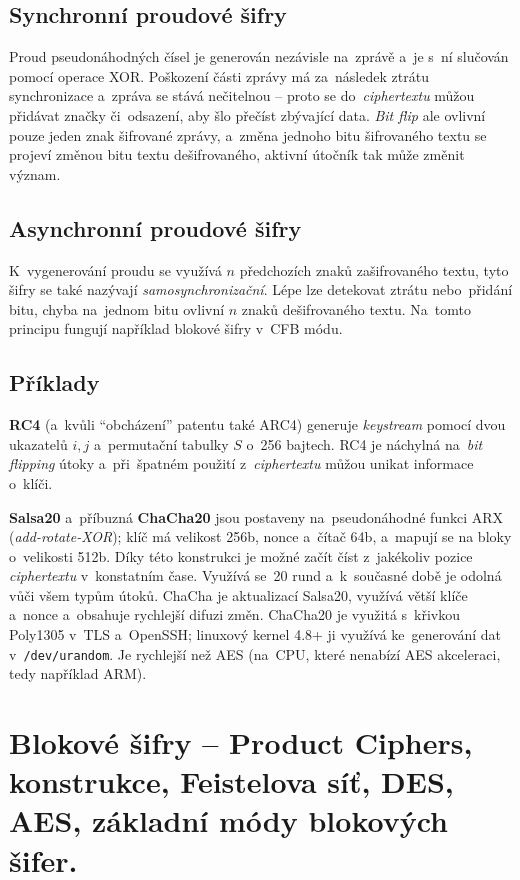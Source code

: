 \subsection{Synchronní proudové šifry}

Proud pseudonáhodných čísel je generován nezávisle na~zprávě a~je s~ní slučován pomocí operace XOR. Poškození části zprávy má za~následek ztrátu synchronizace a~zpráva se stává nečitelnou -- proto se do~\emph{ciphertextu} můžou přidávat značky či~odsazení, aby šlo přečíst zbývající data. \emph{Bit flip} ale ovlivní pouze jeden znak šifrované zprávy, a~změna jednoho bitu šifrovaného textu se projeví změnou bitu textu dešifrovaného, aktivní útočník tak může změnit význam.

\subsection{Asynchronní proudové šifry}

K~vygenerování proudu se využívá $n$ předchozích znaků zašifrovaného textu, tyto šifry se také nazývají \emph{samosynchronizační}. Lépe lze detekovat ztrátu nebo~přidání bitu, chyba na~jednom bitu ovlivní $n$ znaků dešifrovaného textu. Na~tomto principu fungují například blokové šifry v~CFB módu.

\subsection{Příklady}

\textbf{RC4} (a~kvůli \enquote{obcházení} patentu také ARC4) generuje \emph{keystream} pomocí dvou ukazatelů $i, j$ a~permutační tabulky $S$ o~256 bajtech. RC4 je náchylná na~\emph{bit flipping} útoky a~při~špatném použití z~\emph{ciphertextu} můžou unikat informace o~klíči.

\textbf{Salsa20} a~příbuzná \textbf{ChaCha20} jsou postaveny na~pseudonáhodné funkci ARX (\emph{add-rotate-XOR}); klíč má velikost 256b, nonce a~čítač 64b, a~mapují se na bloky o~velikosti 512b. Díky této konstrukci je možné začít číst z~jakékoliv pozice \emph{ciphertextu} v~konstatním čase. Využívá se~20 rund a~k~současné době je odolná vůči všem typům útoků. ChaCha je aktualizací Salsa20, využívá větší klíče a~nonce a~obsahuje rychlejší difuzi změn. ChaCha20 je využitá s~křivkou Poly1305 v~TLS a~OpenSSH; linuxový kernel 4.8+ ji využívá ke~generování dat v~\texttt{/dev/urandom}. Je rychlejší než AES (na~CPU, které nenabízí AES akceleraci, tedy například ARM).

\clearpage
\section{Blokové šifry -- Product Ciphers, konstrukce, Feistelova síť, DES, AES, základní módy blokových šifer.}

